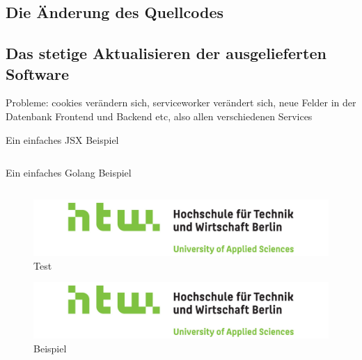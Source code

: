 \subsection{Die Änderung des Quellcodes}

\subsection{Das stetige Aktualisieren der ausgelieferten Software}
Probleme: cookies verändern sich, serviceworker verändert sich, neue Felder in der Datenbank
Frontend und Backend etc, also allen verschiedenen Services


\begin{listing}
    \label{lst:HelloJSX}
    \caption{Ein einfaches JSX Beispiel}
    \inputminted{jsx}{snippets/examples/Welcome.jsx}
\end{listing}

\begin{listing}
    \label{lst:Golang}
    \caption{Ein einfaches Golang Beispiel}
    \inputminted{go}{snippets/examples/hello.go}
\end{listing}

\newpage

\begin{figure}
    \label{figure:test}
    \includegraphics[scale=0.2]{img/HTW}
    \caption{Test}
\end{figure}

\begin{figure}
    \label{figure:beispiel}
    \includegraphics[scale=0.2]{img/HTW}
    \caption{Beispiel}
\end{figure}
